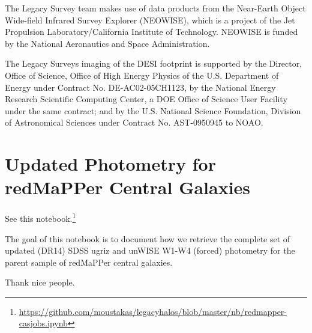 \documentclass[twocolumn]{aastex62}
\newcommand\redmapper{redMaPPer}
\begin{document}
The Legacy Survey team makes use of data products from the Near-Earth Object Wide-field Infrared Survey Explorer (NEOWISE), which is a project of the Jet Propulsion Laboratory/California Institute of Technology. NEOWISE is funded by the National Aeronautics and Space Administration.

The Legacy Surveys imaging of the DESI footprint is supported by the Director, Office of Science, Office of High Energy Physics of the U.S. Department of Energy under Contract No. DE-AC02-05CH1123, by the National Energy Research Scientific Computing Center, a DOE Office of Science User Facility under the same contract; and by the U.S. National Science Foundation, Division of Astronomical Sciences under Contract No. AST-0950945 to NOAO.

\appendix

\section{Updated Photometry for \redmapper{} Central Galaxies}

See this notebook.\footnote{\url{https://github.com/moustakas/legacyhalos/blob/master/nb/redmapper-casjobs.ipynb}}

The goal of this notebook is to document how we retrieve the complete set of updated (DR14) SDSS ugriz and unWISE W1-W4 (forced) photometry for the parent sample of redMaPPer central galaxies.

Thank nice people.



\end{document}
